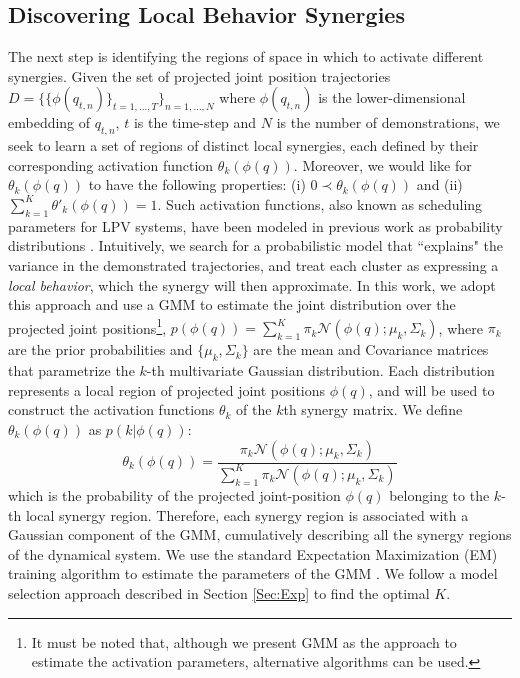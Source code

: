 \documentclass[letterpaper, 10 pt, conference,fleqn]{ieeeconf}
\begin{document}
\subsection{Discovering Local Behavior Synergies}
The next step is identifying the regions of space in which to activate different synergies. Given the set of projected joint position trajectories $D=\{\{\phi(q_{t,n})\}_{t=1,\dots, T}\}_{n=1,\dots,N}$ where $\phi(q_{t,n})$ is the lower-dimensional embedding of $q_{t,n}$, $t$ is the time-step and $N$ is the number of demonstrations, we seek to learn a set of regions of distinct local synergies, each defined by their corresponding activation function $\theta_k(\phi(q))$. Moreover, we would like for $\theta_k(\phi(q))$ to have the following properties: (i) $0 \prec \theta_k(\phi(q))$ and (ii) $\sum_{k=1}^{K}\theta'_k(\phi(q)) = 1$. Such activation functions, also known as scheduling parameters for LPV systems, have been modeled in previous work as probability distributions \cite{7439839, Salehian-RSS-16}. Intuitively, we search for a probabilistic model that ``explains" the variance in the demonstrated trajectories, and treat each cluster as expressing a \textit{local behavior}, which the synergy will then approximate. In this work, we adopt this approach and use a GMM to estimate the joint distribution over the projected joint positions\footnote{It must be noted that, although we present GMM as the approach to estimate the activation parameters, alternative algorithms can be used.}, $p(\phi(q)) = \sum_{k=1}^K\pi_k\mathcal{N}(\phi(q);\mu_k,\Sigma_k)$, where $\pi_k$ are the prior probabilities and $\{\mu_k,\Sigma_k\}$ are the mean and Covariance matrices that parametrize the $k$-th multivariate Gaussian distribution. Each distribution represents a local region of projected joint positions $\phi(q)$, and will be used to construct the activation functions $\theta_k$ of the $k$th synergy matrix. We define $\theta_k(\phi(q))$ as $p(k|\phi(q))$:
\begin{equation}
\label{eq:theta}
\theta_k(\phi(q))= \frac{\pi_k\mathcal{N} (\phi(q); \mu_k, \Sigma_k)}{\sum_{k=1}^K \pi_k\mathcal{N} (\phi(q); \mu_k, \Sigma_k)}
\end{equation}
which is the probability of the projected joint-position $\phi(q)$ belonging to the $k$-th local synergy region. Therefore, each synergy region is associated with a Gaussian component of the GMM, cumulatively describing all the synergy regions of the dynamical system. We use the standard Expectation Maximization (EM) training algorithm to estimate the parameters of the GMM \cite{Bilmes98agentle}.  We follow a model selection approach described in Section \ref{Sec:Exp} to find the optimal $K$.
\end{document}

